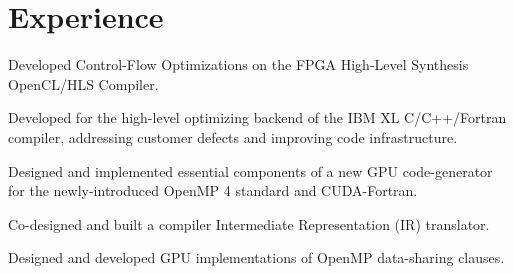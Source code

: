 \documentclass[]{twocol-resume}
\begin{document}
\hfill
\begin{minipage}[t]{0.66\textwidth}

\section{Experience}

\vspace{\topsep} %
\sectionseptiny

\vspace{\topsep} %
\begin{tightemize}
\item Developed Control-Flow Optimizations on the FPGA High-Level Synthesis
  \\\hspace{-3mm}OpenCL/HLS Compiler.
\end{tightemize}
\sectionseptiny

\begin{tightemize}
\item Developed for the high-level optimizing backend of the IBM XL
  C/C++/Fortran \\\hspace{-3mm}compiler, addressing customer defects and
  improving code infrastructure.
\item Designed and implemented essential components of a new GPU code-generator
  \\\hspace{-3mm}for the newly-introduced OpenMP 4 standard and
  CUDA-Fortran.
\item Co-designed and built a compiler Intermediate Representation (IR)
  translator.
\item Designed and developed GPU implementations of OpenMP data-sharing clauses.
\end{tightemize}
\vspace*{-1mm}
\sectionseptiny


\end{minipage}
\end{document}
